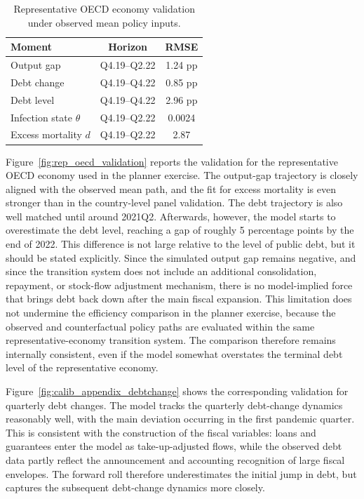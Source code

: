 \documentclass[12pt, a4paper]{article}
\begin{document}
\begin{table}[H]
\centering
\caption{Representative OECD economy validation under observed mean policy inputs.}
\label{tab:rep_economy_validation}
\scriptsize
\begin{tabular}{lcc}
\toprule
\textbf{Moment} & \textbf{Horizon} & \textbf{RMSE} \\
\midrule
Output gap & Q4.19--Q2.22 & 1.24 pp \\
Debt change & Q4.19--Q4.22 & 0.85 pp \\
Debt level & Q4.19--Q4.22 & 2.96 pp \\
Infection state $\theta$ & Q4.19--Q2.22 & 0.0024 \\
Excess mortality $d$ & Q4.19--Q2.22 & 2.87 \\
\bottomrule
\end{tabular}
\end{table}

\noindent Figure~\ref{fig:rep_oecd_validation} reports the validation for the representative OECD economy used in the planner exercise. The output-gap trajectory is closely aligned with the observed mean path, and the fit for excess mortality is even stronger than in the country-level panel validation. The debt trajectory is also well matched until around 2021Q2. Afterwards, however, the model starts to overestimate the debt level, reaching a gap of roughly 5 percentage points by the end of 2022. This difference is not large relative to the level of public debt, but it should be stated explicitly. Since the simulated output gap remains negative, and since the transition system does not include an additional consolidation, repayment, or stock-flow adjustment mechanism, there is no model-implied force that brings debt back down after the main fiscal expansion. This limitation does not undermine the efficiency comparison in the planner exercise, because the observed and counterfactual policy paths are evaluated within the same representative-economy transition system. The comparison therefore remains internally consistent, even if the model somewhat overstates the terminal debt level of the representative economy.

Figure~\ref{fig:calib_appendix_debtchange} shows the corresponding validation for quarterly debt changes. The model tracks the quarterly debt-change dynamics reasonably well, with the main deviation occurring in the first pandemic quarter. This is consistent with the construction of the fiscal variables: loans and guarantees enter the model as take-up-adjusted flows, while the observed debt data partly reflect the announcement and accounting recognition of large fiscal envelopes. The forward roll therefore underestimates the initial jump in debt, but captures the subsequent debt-change dynamics more closely.
\end{document}
